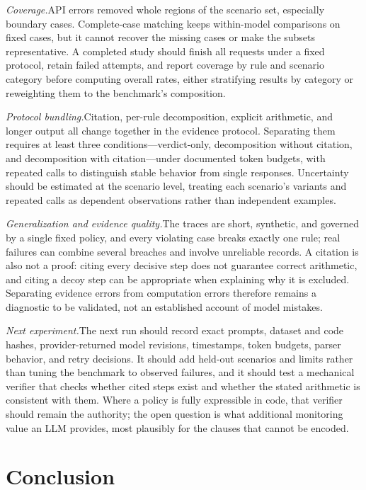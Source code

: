 \documentclass[11pt,letterpaper]{article}
\newcommand{\runin}[1]{\textit{#1.}\enspace}
\begin{document}
\runin{Coverage}API errors removed whole regions of the scenario set, especially boundary cases. Complete-case matching keeps within-model comparisons on fixed cases, but it cannot recover the missing cases or make the subsets representative. A completed study should finish all requests under a fixed protocol, retain failed attempts, and report coverage by rule and scenario category before computing overall rates, either stratifying results by category or reweighting them to the benchmark's composition.

\runin{Protocol bundling}Citation, per-rule decomposition, explicit arithmetic, and longer output all change together in the evidence protocol. Separating them requires at least three conditions---verdict-only, decomposition without citation, and decomposition with citation---under documented token budgets, with repeated calls to distinguish stable behavior from single responses. Uncertainty should be estimated at the scenario level, treating each scenario's variants and repeated calls as dependent observations rather than independent examples.

\runin{Generalization and evidence quality}The traces are short, synthetic, and governed by a single fixed policy, and every violating case breaks exactly one rule; real failures can combine several breaches and involve unreliable records. A citation is also not a proof: citing every decisive step does not guarantee correct arithmetic, and citing a decoy step can be appropriate when explaining why it is excluded. Separating evidence errors from computation errors therefore remains a diagnostic to be validated, not an established account of model mistakes.

\runin{Next experiment}The next run should record exact prompts, dataset and code hashes, provider-returned model revisions, timestamps, token budgets, parser behavior, and retry decisions. It should add held-out scenarios and limits rather than tuning the benchmark to observed failures, and it should test a mechanical verifier that checks whether cited steps exist and whether the stated arithmetic is consistent with them. Where a policy is fully expressible in code, that verifier should remain the authority; the open question is what additional monitoring value an LLM provides, most plausibly for the clauses that cannot be encoded.

\section{Conclusion}
\end{document}
